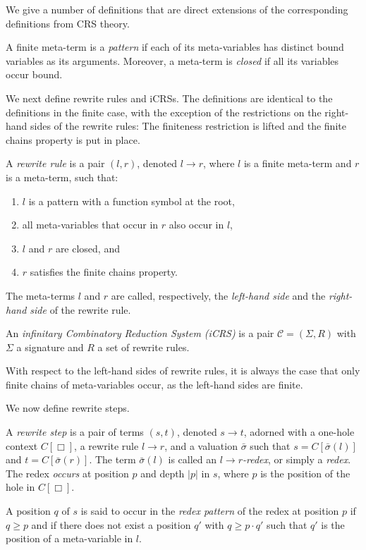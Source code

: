 \documentclass{LMCS}
\theoremstyle{definition}
\newcommand{\trsp}[3]{\mathcal{#1} = (#2, #3)}
\newcommand{\rew}{\rightarrow}
\begin{document}
We give a number of definitions that are direct extensions of the
corresponding definitions from CRS theory.

\begin{defi}
A finite meta-term is a \emph{pattern} if each of its meta-variables has distinct bound variables as its arguments. Moreover, a meta-term is \emph{closed} if all its variables occur bound.
\end{defi}

We next define rewrite rules and iCRSs. The definitions are identical to the definitions in the finite case, with the exception of the restrictions on the right-hand sides of the rewrite rules: The finiteness restriction is lifted and the finite chains property is put in place. 
\begin{defi}
A \emph{rewrite rule} is a pair $(l, r)$, denoted $l \rew r$, where $l$ is a finite meta-term and $r$ is a meta-term, such that:
\begin{enumerate}[(1)]
\item
$l$ is a pattern with a function symbol at the root,
\item
all meta-variables that occur in $r$ also occur in $l$, 
\item
$l$ and $r$ are closed, and
\item
$r$ satisfies the finite chains property.
\end{enumerate}
The meta-terms $l$ and $r$ are called, respectively, the \emph{left-hand side}
and the \emph{right-hand side} of the rewrite rule.

An \emph{infinitary Combinatory Reduction System (iCRS)} is a pair
$\trsp{C}{\Sigma}{R}$ with $\Sigma$ a signature and $R$ a set of rewrite rules.
\end{defi}

With respect to the left-hand sides of rewrite rules, it is always the case that only finite chains of meta-variables occur, as the left-hand sides are finite.

We now define rewrite steps.
\begin{defi}
A \emph{rewrite step} is a pair of terms $(s, t)$, denoted $s \rew t$, adorned with a one-hole context $C[\Box]$, a rewrite rule $l \rew r$, and a valuation $\bar{\sigma}$ such that $s = C[\bar{\sigma}(l)]$ and $t = C[\bar{\sigma}(r)]$.
The term
$\bar{\sigma}(l)$ is called an \emph{$l \rew r$-redex}, or
simply a \emph{redex}. The redex \emph{occurs} at position $p$ and
depth $|p|$ in $s$, where $p$ is the position of the hole in $C[\Box]$.

A position $q$ of $s$ is said to occur in the \emph{redex pattern} of
the redex at position $p$ if $q \geq p$ and if there does
not exist a position $q'$ with $q \geq p \cdot q'$ such that $q'$ is the
position of a meta-variable in $l$.
\end{defi}
\end{document}

